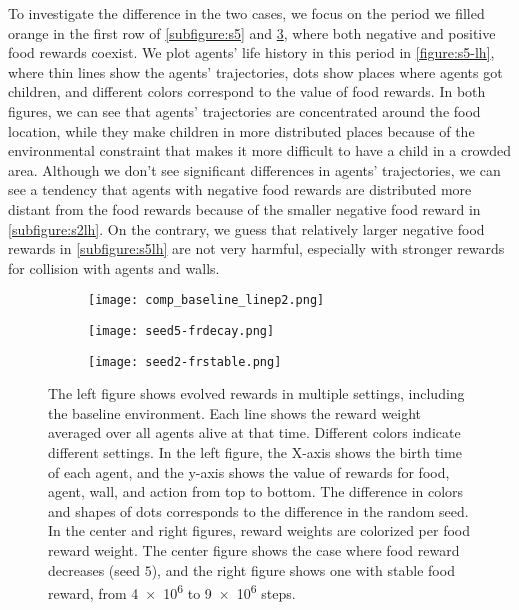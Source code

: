 To investigate the difference in the two cases, we focus on the period we filled orange in the first row of \cref{subfigure:s5} and \cref{subfigure:s2}, where both negative and positive food rewards coexist. We plot agents' life history in this period in \cref{figure:s5-lh}, where thin lines show the agents' trajectories, dots show places where agents got children, and different colors correspond to the value of food rewards. In both figures, we can see that agents' trajectories are concentrated around the food location, while they make children in more distributed places because of the environmental constraint that makes it more difficult to have a child in a crowded area.
Although we don't see significant differences in agents' trajectories, we can see a tendency that agents with negative food rewards are distributed more distant from the food rewards because of the smaller negative food reward in \cref{subfigure:s2lh}. On the contrary, we guess that relatively larger negative food rewards in \cref{subfigure:s5lh} are not very harmful, especially with stronger rewards for collision with agents and walls.

\begin{figure}[t]
  \begin{subfigure}[t]{6cm}
    \centering
    \texttt{[image: comp\_baseline\_linep2.png]}
    \label{subfigure:blcomp}
  \end{subfigure}
  \begin{subfigure}[t]{4.5cm}
    \centering
    \texttt{[image: seed5-frdecay.png]}
    \label{subfigure:s4.5}
  \end{subfigure}
  \begin{subfigure}[t]{4.5cm}
    \centering
    \texttt{[image: seed2-frstable.png]}
    \label{subfigure:s2}
  \end{subfigure}
  \caption{
    The left figure shows evolved rewards in multiple settings, including the baseline environment.
    Each line shows the reward weight averaged over all agents alive at that time.
    Different colors indicate different settings.
    In the left figure, the X-axis shows the birth time of each agent, and the y-axis shows the value of rewards for food, agent, wall, and action from top to bottom. The difference in colors and shapes of dots corresponds to the difference in the random seed. In the center and right figures, reward weights are colorized per food reward weight. The center figure shows the case where food reward decreases (seed $5$), and the right figure shows one with stable food reward,  from \num{4e6} to \num{9e6} steps.
  }\label{figure:baseline-result}
\end{figure}

